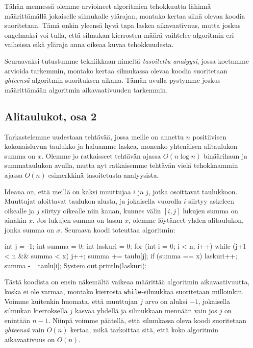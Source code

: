 Tähän mennessä olemme arvioineet algoritmien tehokkuutta
lähinnä määrit\-tämällä jokaiselle silmukalle ylärajan,
montako kertaa siinä olevaa koodia suoritetaan.
Tämä onkin yleensä hyvä tapa laskea aikavaativuus,
mutta joskus ongelmaksi voi tulla, että silmukan kierrosten
määrä vaihtelee algoritmin eri vaiheissa eikä yläraja
anna oikeaa kuvaa tehokkuudesta.

Seuraavaksi tutustumme tekniikkaan nimeltä
\emph{tasoitettu analyysi}, jossa koetamme arvioida tarkemmin,
montako kertaa silmukassa olevaa koodia suoritetaan
\emph{yhteensä} algoritmin suorituksen aikana.
Tämän avulla pystymme joskus määrittämään algoritmin
aikavaativuuden tarkemmin.

\subsection{Alitaulukot, osa 2}

Tarkastelemme uudestaan tehtävää, jossa meille on annettu
$n$ positiivisen kokonaisluvun taulukko ja haluamme laskea,
monenko yhtenäisen alitaulukon summa on $x$.
Olemme jo ratkaisseet tehtävän ajassa $O(n \log n)$
binäärihaun ja summataulukon avulla,
mutta nyt ratkaisemme tehtävän vielä tehokkaammin
ajassa $O(n)$ esimerkkinä tasoitetusta analyysista.

Ideana on, että meillä on kaksi muuttujaa $i$ ja $j$,
jotka osoittavat taulukkoon.
Muuttujat aloittavat taulukon alusta,
ja jokaisella vuorolla $i$ siirtyy askeleen oikealle
ja $j$ siirtyy oikealle niin kauan, kunnes välin $[i,j]$
lukujen summa on ainakin $x$.
Jos lukujen summa on tasan $x$, olemme löytäneet yhden
alitaulukon, jonka summa on $x$.
Seuraava koodi toteuttaa algoritmin:

\begin{code}
int j = -1;
int summa = 0;
int laskuri = 0;
for (int i = 0; i < n; i++) {
    while (j+1 < n && summa < x) {
        j++;
        summa += taulu[j];
    }
    if (summa == x) laskuri++;
    summa -= taulu[i];
}
System.out.println(laskuri);
\end{code}

Tästä koodista on ensin näkemältä vaikeaa määrittää algoritmin
aikavaativuutta, koska ei ole varmaa, montako kierrosta
\texttt{while}-silmukkaa suoritetaan milloinkin.
Voimme kuitenkin huomata, että muuttujan $j$ arvo on aluksi $-1$,
jokaisella silmukan kierroksella $j$ kasvaa yhdellä
ja silmukkaan mennään vain jos $j$ on enintään $n-1$.
Niinpä voimme päätellä, että silmukassa oleva koodi suoritetaan \emph{yhteensä}
vain $O(n)$ kertaa, mikä tarkoittaa sitä,
että koko algoritmin aikavaativuus on $O(n)$.

